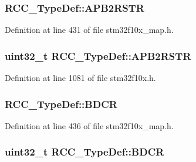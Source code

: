\subsubsection[{\texorpdfstring{A\+P\+B2\+R\+S\+TR}{APB2RSTR}}]{ R\+C\+C\+\_\+\+Type\+Def\+::\+A\+P\+B2\+R\+S\+TR}\hypertarget{struct_r_c_c___type_def_a7f6cee7f43c0c67e5fccef387f9d530c}{}\label{struct_r_c_c___type_def_a7f6cee7f43c0c67e5fccef387f9d530c}


Definition at line 431 of file stm32f10x\+\_\+map.\+h.

\subsubsection[{\texorpdfstring{A\+P\+B2\+R\+S\+TR}{APB2RSTR}}]{ {\bf uint32\+\_\+t} R\+C\+C\+\_\+\+Type\+Def\+::\+A\+P\+B2\+R\+S\+TR}\hypertarget{struct_r_c_c___type_def_a4491ab20a44b70bf7abd247791676a59}{}\label{struct_r_c_c___type_def_a4491ab20a44b70bf7abd247791676a59}


Definition at line 1081 of file stm32f10x.\+h.

\subsubsection[{\texorpdfstring{B\+D\+CR}{BDCR}}]{ R\+C\+C\+\_\+\+Type\+Def\+::\+B\+D\+CR}\hypertarget{struct_r_c_c___type_def_a2a23e96ace64f4047c27616cd20bc6c0}{}\label{struct_r_c_c___type_def_a2a23e96ace64f4047c27616cd20bc6c0}


Definition at line 436 of file stm32f10x\+\_\+map.\+h.

\subsubsection[{\texorpdfstring{B\+D\+CR}{BDCR}}]{ {\bf uint32\+\_\+t} R\+C\+C\+\_\+\+Type\+Def\+::\+B\+D\+CR}\hypertarget{struct_r_c_c___type_def_a05be375db50e8c9dd24fb3bcf42d7cf1}{}\label{struct_r_c_c___type_def_a05be375db50e8c9dd24fb3bcf42d7cf1}


